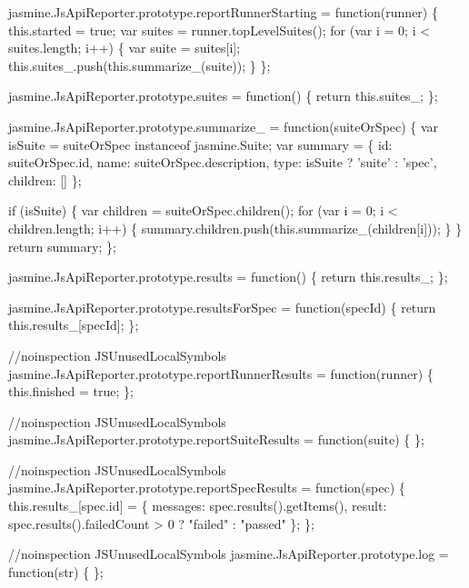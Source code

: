 \begin{DoxyCodeInclude}
jasmine.JsApiReporter.prototype.reportRunnerStarting = \textcolor{keyword}{function}(runner) \{
  this.started = \textcolor{keyword}{true};
  var suites = runner.topLevelSuites();
  \textcolor{keywordflow}{for} (var i = 0; i < suites.length; i++) \{
    var suite = suites[i];
    this.suites\_.push(this.summarize\_(suite));
  \}
\};

jasmine.JsApiReporter.prototype.suites = \textcolor{keyword}{function}() \{
  \textcolor{keywordflow}{return} this.suites\_;
\};

jasmine.JsApiReporter.prototype.summarize\_ = \textcolor{keyword}{function}(suiteOrSpec) \{
  var isSuite = suiteOrSpec instanceof jasmine.Suite;
  var summary = \{
    \textcolor{keywordtype}{id}: suiteOrSpec.id,
    name: suiteOrSpec.description,
    type: isSuite ? \textcolor{stringliteral}{'suite'} : \textcolor{stringliteral}{'spec'},
    children: []
  \};

  \textcolor{keywordflow}{if} (isSuite) \{
    var children = suiteOrSpec.children();
    \textcolor{keywordflow}{for} (var i = 0; i < children.length; i++) \{
      summary.children.push(this.summarize\_(children[i]));
    \}
  \}
  \textcolor{keywordflow}{return} summary;
\};

jasmine.JsApiReporter.prototype.results = \textcolor{keyword}{function}() \{
  \textcolor{keywordflow}{return} this.results\_;
\};

jasmine.JsApiReporter.prototype.resultsForSpec = \textcolor{keyword}{function}(specId) \{
  \textcolor{keywordflow}{return} this.results\_[specId];
\};

\textcolor{comment}{//noinspection JSUnusedLocalSymbols}
jasmine.JsApiReporter.prototype.reportRunnerResults = \textcolor{keyword}{function}(runner) \{
  this.finished = \textcolor{keyword}{true};
\};

\textcolor{comment}{//noinspection JSUnusedLocalSymbols}
jasmine.JsApiReporter.prototype.reportSuiteResults = \textcolor{keyword}{function}(suite) \{
\};

\textcolor{comment}{//noinspection JSUnusedLocalSymbols}
jasmine.JsApiReporter.prototype.reportSpecResults = \textcolor{keyword}{function}(spec) \{
  this.results\_[spec.id] = \{
    messages: spec.results().getItems(),
    result: spec.results().failedCount > 0 ? \textcolor{stringliteral}{"failed"} : \textcolor{stringliteral}{"passed"}
  \};
\};

\textcolor{comment}{//noinspection JSUnusedLocalSymbols}
jasmine.JsApiReporter.prototype.log = \textcolor{keyword}{function}(str) \{
\};


\end{DoxyCodeInclude}
